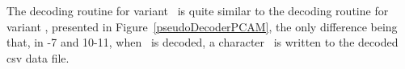 The decoding routine for variant \NOmaskalgo\ is quite similar to the decoding routine for variant \maskalgo, presented in Figure~\ref{pseudoDecoderPCAM}, the only difference being that, in -7 and 10-11, when \nodata\ is decoded, a character \noData\ is written to the decoded csv data file.

